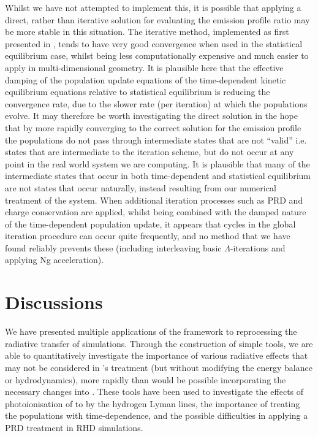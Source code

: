 Whilst we have not attempted to implement this, it is possible that applying a direct, rather than iterative solution for evaluating the emission profile ratio may be more stable in this situation.
The iterative method, implemented as first presented in \citet{Uitenbroek2001}, tends to have very good convergence when used in the statistical equilibrium case, whilst being less computationally expensive and much easier to apply in multi-dimensional geometry.
It is plausible here that the effective damping of the population update equations of the time-dependent kinetic equilibrium equations relative to statistical equilibrium is reducing the convergence rate, due to the slower rate (per iteration) at which the populations evolve.
It may therefore be worth investigating the direct solution in the hope that by more rapidly converging to the correct solution for the emission profile the populations do not pass through intermediate states that are not ``valid'' i.e. states that are intermediate to the iteration scheme, but do not occur at any point in the real world system we are computing.
It is plausible that many of the intermediate states that occur in both time-dependent and statistical equilibrium are not states that occur naturally, instead resulting from our numerical treatment of the system.
When additional iteration processes such as PRD and charge conservation are applied, whilst being combined with the damped nature of the time-dependent population update, it appears that cycles in the global iteration procedure can occur quite frequently, and no method that we have found reliably prevents these (including interleaving basic $\Lambda$-iterations and applying Ng acceleration).

\section{Discussions}

We have presented multiple applications of the \Lw{} framework to reprocessing the radiative transfer of \Radyn{} simulations.
Through the construction of simple tools, we are able to quantitatively investigate the importance of various radiative effects that may not be considered in \Radyn{}'s treatment (but without modifying the energy balance or hydrodynamics), more rapidly than would be possible incorporating the necessary changes into \Radyn{}.
These tools have been used to investigate the effects of photoionisation of \Caii{} to \Caiii{} by the hydrogen Lyman lines, the importance of treating the \Caii{} populations with time-dependence, and the possible difficulties in applying a PRD treatment in RHD simulations.

